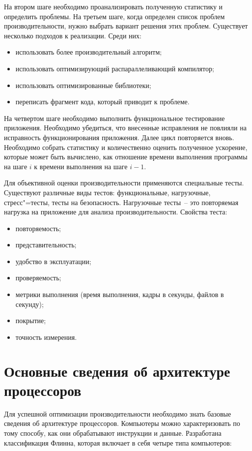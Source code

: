 \documentclass[14pt, a4paper, openany, twoside, draft]{extbook} %
\begin{document}
На втором шаге необходимо проанализировать полученную статистику и определить проблемы.
На третьем шаге, когда определен список проблем производительности, нужно выбрать вариант решения этих проблем. Существует несколько подходов к реализации. Среди них:
\begin{itemize}
\item использовать более производительный алгоритм;
\item использовать оптимизирующий распараллеливающий компилятор;
\item использовать оптимизированные библиотеки;
\item переписать фрагмент кода, который приводит к проблеме.
\end{itemize}

На четвертом шаге необходимо выполнить функциональное тестирование приложения. Необходимо убедиться, что внесенные исправления не повлияли на исправность функционирования приложения.
Далее цикл повторяется вновь. Необходимо собрать статистику и количественно оценить полученное ускорение, которые может быть вычислено, как отношение времени выполнения программы на шаге $i$ к времени выполнения на шаге $i-1$.

Для объективной оценки производительности применяются специальные тесты. Существуют различные виды тестов: функциональные, нагрузочные, стресс"=тесты, тесты на безопасность. Нагрузочные тесты~-- это повторяемая нагрузка на приложение для анализа производительности.  Свойства теста:
\begin{itemize}
\item повторяемость;
\item представительность;
\item удобство в эксплуатации;
\item проверяемость;
\item метрики выполнения (время выполнения, кадры в секунды, файлов в секунду);
\item покрытие;
\item точность измерения.
\end{itemize}

\section{Основные сведения об архитектуре процессоров}
\label{sec:CPU-arch}

Для успешной оптимизации производительности необходимо знать базовые сведения об архитектуре процессоров. Компьютеры можно характеризовать по тому способу, как они обрабатывают инструкции и данные. Разработана классификация Флинна, которая включает в себя четыре типа компьютеров:
\end{document}
